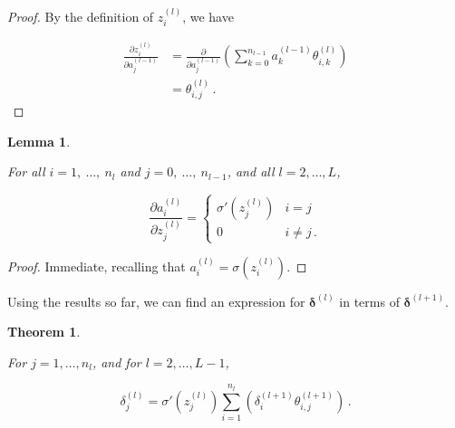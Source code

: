 \documentclass{article}[11pt]
\newtheorem{lemma}{Lemma}
\newtheorem{theorem}{Theorem}
\begin{document}
        \begin{proof}
            
            By the definition of $z^{(l)}_i$, we have
            
            $$ \begin{aligned}
            \frac{\partial z^{(l)}_i}{\partial a^{(l-1)}_j}
            &= \frac{\partial}{\partial a^{(l-1)}_j} \left( \sum_{k=0}^{n_{l-1}} a^{(l-1)}_k \theta^{(l)}_{i,k} \right) \\
            &= \theta^{(l)}_{i,j} \,.
            \end{aligned} $$
            
        \end{proof}
    
    
        \begin{lemma} \label{thm:da_dz}
            
            For all $i = 1, \ \ldots, \ n_l$ and $j = 0, \ \ldots, \ n_{l-1}$, and all $l = 2, \ldots, L$,
            
            $$
            \frac{\partial a^{(l)}_i}{\partial z^{(l)}_j} = \begin{cases}
                \sigma'(z^{(l)}_j) & i = j \\
                0 & i \neq j \,.
            \end{cases}
            $$
            
        \end{lemma}
        
        \begin{proof}
            
            Immediate, recalling that $a^{(l)}_i = \sigma(z^{(l)}_i)$.
            
        \end{proof}
        
        
        Using the results so far, we can find an expression for $\boldsymbol{\delta}^{(l)}$ in terms of $\boldsymbol{\delta}^{(l+1)}$.
        
        
        \begin{theorem} \label{thm:delta}
            
            For $j = 1, \ldots, n_l$, and for $l = 2, \ldots, L-1$,
            
            $$
            \delta^{(l)}_j = \sigma'(z^{(l)}_j) \sum_{i=1}^{n_l} \left( \delta^{(l+1)}_i \theta^{(l+1)}_{i,j} \right) \,.
            $$
            
        \end{theorem}
    
\end{document}
